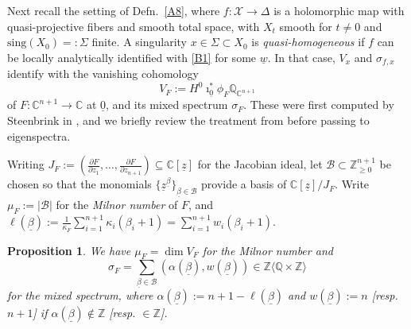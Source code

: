\documentclass[12pt,letterpaper,english]{amsart}
\numberwithin{equation}{section}
\numberwithin{figure}{section}
\theoremstyle{plain}
\theoremstyle{remark}
\theoremstyle{definition}
\theoremstyle{definition}
\theoremstyle{plain}
\theoremstyle{plain}
\newtheorem{prop}[equation]{Proposition}
\theoremstyle{plain}
\theoremstyle{plain}
\theoremstyle{definition}
\def\d{\partial}
\def\uo{\underline{0}}
\def\QQ{\mathbb{Q}}
\def\CC{\mathbb{C}}
\def\ZZ{\mathbb{Z}}
\def\uz{\underline{z}}
\def\X{\mathcal{X}}
\def\uw{\underline{w}}
\theoremstyle{definition}
\begin{document}
Next recall the setting of Defn.~\ref{A8}, where $f\colon \X\to \Delta$ is a holomorphic map with quasi-projective fibers and smooth total space, with $X_t$ smooth for $t\neq 0$ and $\mathrm{sing}(X_0)=:\Sigma$ finite.  A singularity $x\in \Sigma\subset X_0$ is \emph{quasi-homogeneous} if $f$ can be locally analytically identified with \eqref{B1} for some $\uw$.  In that case, $V_x$ and $\sigma_{f,x}$ identify with the vanishing cohomology
\begin{equation}\label{B2}
V_F:=H^0\imath^*_{\uo}\phi_F \QQ_{\CC^{n+1}}
\end{equation}
of $F\colon \CC^{n+1}\to \CC$ at $\uo$, and its mixed spectrum $\sigma_F$.  These were first computed by Steenbrink in \cite{St}, and we briefly review the treatment from \cite[\S2]{KL2} before passing to eigenspectra.

Writing $J_F:=(\tfrac{\d F}{\d z_1},\ldots ,\tfrac{\d F}{\d z_{n+1}})\subseteq \CC[\uz]$ for the Jacobian ideal, let $\mathcal{B}\subset \ZZ_{\geq 0}^{n+1}$ be chosen so that the monomials $\{\uz^{\underline{\beta}}\}_{\underline{\beta}\in \mathcal{B}}$ provide a basis of $\CC[\uz]/J_F$.  Write $\mu_F:=|\mathcal{B}|$ for the \emph{Milnor number} of $F$, and $\ell(\underline{\beta}):=\tfrac{1}{\kappa_{F}}\sum_{i=1}^{n+1}\kappa_i(\beta_i+1)=\sum_{i=1}^{n+1}w_i(\beta_i+1)$.

\begin{prop}\label{B3}
We have $\mu_F=\dim V_F$ for the Milnor number and
$$\sigma_F=\textstyle\sum_{\underline{\beta}\in \mathcal{B}}(\alpha(\underline{\beta}),w(\underline{\beta}))\in \ZZ\langle \QQ\times \ZZ\rangle$$
for the mixed spectrum, where $\alpha(\underline{\beta}):=n+1-\ell(\underline{\beta})$ and $w(\underline{\beta}):=n$ \textup{[}resp. $n+1$\textup{]} if $\alpha(\underline{\beta})\notin \ZZ$ \textup{[}resp. $\in \ZZ$\textup{]}.
\end{prop}
\end{document}
